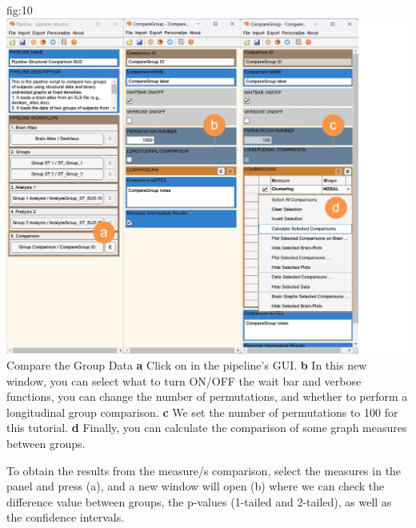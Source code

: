\documentclass[justified]{tufte-handout}
\begin{document}
	{fig:10}
	{\includegraphics{fig10.jpg}}
	{Compare the Group Data}
	{
	{\bf a} Click on  in the pipeline's GUI.
	{\bf b} In this new window, you can select what to turn ON/OFF the wait bar and verbose functions, you can change the number of permutations, and whether to perform a longitudinal group comparison. {\bf c} We set the number of permutations to 100 for this tutorial. {\bf d} Finally, you can calculate the comparison of some graph measures between groups.
	}
 
 
To obtain the results from the measure/s comparison, select the measures in the  panel and press (a), and a new window will open (b) where we can check the difference value between groups, the p-values (1-tailed and 2-tailed), as well as the confidence intervals.
\end{document}
